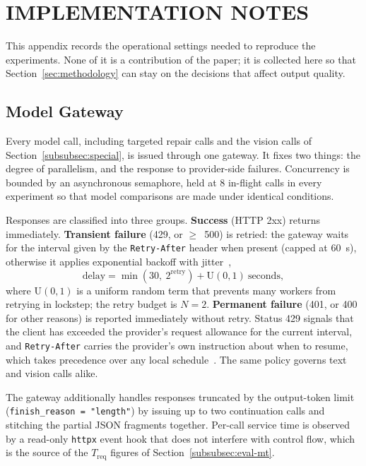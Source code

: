 \section{IMPLEMENTATION NOTES}
\label{app:implementation}

This appendix records the operational settings needed to reproduce the
experiments. None of it is a contribution of the paper; it is collected here so
that Section~\ref{sec:methodology} can stay on the decisions that affect output
quality.

\subsection{Model Gateway}
\label{app:gateway}

Every model call, including targeted repair calls and the vision calls of
Section~\ref{subsubsec:special}, is issued through one gateway. It fixes two
things: the degree of parallelism, and the response to provider-side failures.
Concurrency is bounded by an asynchronous semaphore, held at 8 in-flight calls in
every experiment so that model comparisons are made under identical conditions.

Responses are classified into three groups. \textbf{Success} (HTTP 2xx) returns
immediately. \textbf{Transient failure} (429, or $\ge$~500) is retried: the
gateway waits for the interval given by the \texttt{Retry-After} header when
present (capped at 60~s), otherwise it applies exponential backoff with
jitter~\citep{exponential-backoff,aws-backoff-jitter},
\[
    \text{delay} = \min(30,\ 2^{\text{retry}}) + \mathrm{U}(0,1)\ \text{seconds},
\]
where $\mathrm{U}(0,1)$ is a uniform random term that prevents many workers from
retrying in lockstep; the retry budget is $N = 2$. \textbf{Permanent failure}
(401, or 400 for other reasons) is reported immediately without retry. Status 429
signals that the client has exceeded the provider's request allowance for the
current interval, and \texttt{Retry-After} carries the provider's own instruction
about when to resume, which takes precedence over any local
schedule~\citep{api-rate-limit-design}. The same policy governs text and vision
calls alike.

The gateway additionally handles responses truncated by the output-token limit
(\texttt{finish\_reason = "length"}) by issuing up to two continuation calls and
stitching the partial JSON fragments together. Per-call service time is observed
by a read-only \texttt{httpx} event hook that does not interfere with control
flow, which is the source of the $T_{\text{req}}$ figures of
Section~\ref{subsubsec:eval-mt}.


